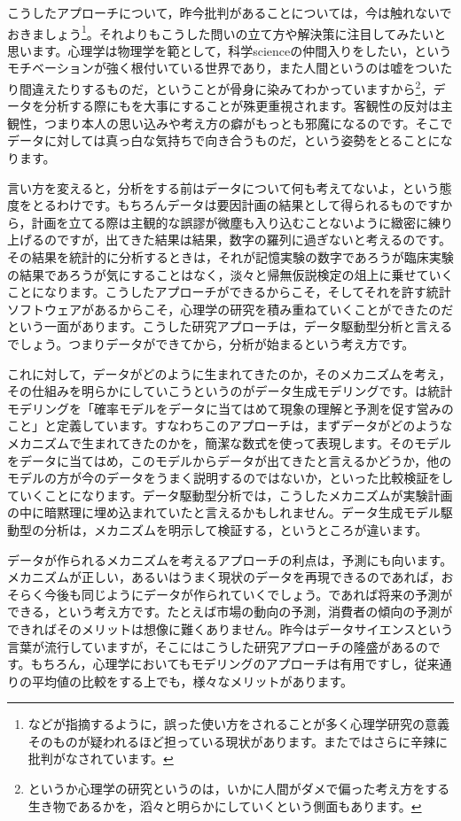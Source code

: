 \documentclass{ltjsbook}
\begin{document}
こうしたアプローチについて，昨今批判があることについては，今は触れないでおきましょう\footnote{\citet{amrhein2019scientists}などが指摘するように，誤った使い方をされることが多く心理学研究の意義そのものが疑われるほど担っている現状があります。また\citet{豊田202003}ではさらに辛辣に批判がなされています。}。それよりもこうした問いの立て方や解決策に注目してみたいと思います。心理学は物理学を範として，科学scienceの仲間入りをしたい，というモチベーションが強く根付いている世界であり，また人間というのは嘘をついたり間違えたりするものだ，ということが骨身に染みてわかっていますから\footnote{というか心理学の研究というのは，いかに人間がダメで偏った考え方をする生き物であるかを，滔々と明らかにしていくという側面もあります。}，データを分析する際にもを大事にすることが殊更重視されます。客観性の反対は主観性，つまり本人の思い込みや考え方の癖がもっとも邪魔になるのです。そこでデータに対しては真っ白な気持ちで向き合うものだ，という姿勢をとることになります。

言い方を変えると，分析をする前はデータについて何も考えてないよ，という態度をとるわけです。もちろんデータは要因計画の結果として得られるものですから，計画を立てる際は主観的な誤謬が微塵も入り込むことないように緻密に練り上げるのですが，出てきた結果は結果，数字の羅列に過ぎないと考えるのです。その結果を統計的に分析するときは，それが記憶実験の数字であろうが臨床実験の結果であろうが気にすることはなく，淡々と帰無仮説検定の俎上に乗せていくことになります。こうしたアプローチができるからこそ，そしてそれを許す統計ソフトウェアがあるからこそ，心理学の研究を積み重ねていくことができたのだという一面があります。こうした研究アプローチは，データ駆動型分析と言えるでしょう。つまりデータができてから，分析が始まるという考え方です。

これに対して，データがどのように生まれてきたのか，そのメカニズムを考え，その仕組みを明らかにしていこうというのがデータ生成モデリングです。\citet{松浦201610}は統計モデリングを「確率モデルをデータに当てはめて現象の理解と予測を促す営みのこと」と定義しています。すなわちこのアプローチは，まずデータがどのようなメカニズムで生まれてきたのかを，簡潔な数式を使って表現します。そのモデルをデータに当てはめ，このモデルからデータが出てきたと言えるかどうか，他のモデルの方が今のデータをうまく説明するのではないか，といった比較検証をしていくことになります。データ駆動型分析では，こうしたメカニズムが実験計画の中に暗黙理に埋め込まれていたと言えるかもしれません。データ生成モデル駆動型の分析は，メカニズムを明示して検証する，というところが違います。

データが作られるメカニズムを考えるアプローチの利点は，予測にも向います。メカニズムが正しい，あるいはうまく現状のデータを再現できるのであれば，おそらく今後も同じようにデータが作られていくでしょう。であれば将来の予測ができる，という考え方です。たとえば市場の動向の予測，消費者の傾向の予測ができればそのメリットは想像に難くありません。昨今はデータサイエンスという言葉が流行していますが，そこにはこうした研究アプローチの隆盛があるのです。もちろん，心理学においてもモデリングのアプローチは有用ですし，従来通りの平均値の比較をする上でも，様々なメリットがあります。
\end{document}
